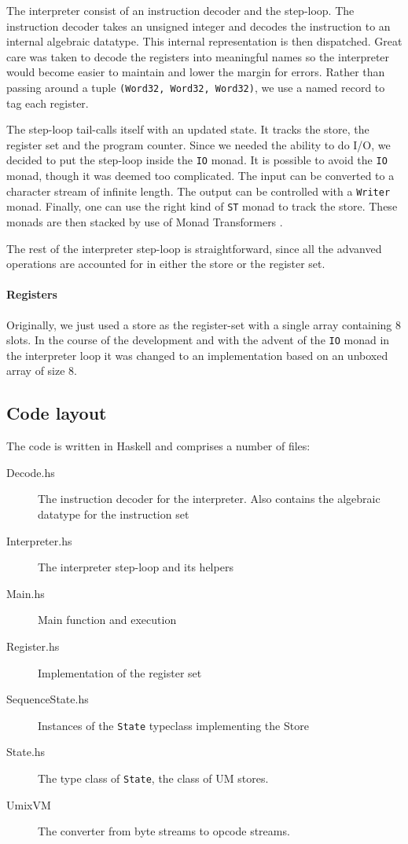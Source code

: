The interpreter consist of an instruction decoder and the
step-loop. The instruction decoder takes an unsigned integer and
decodes the instruction to an internal algebraic datatype. This
internal representation is then dispatched. Great care was taken to
decode the registers into meaningful names so the interpreter would
become easier to maintain and lower the margin for errors. Rather than
passing around a tuple \texttt{(Word32, Word32, Word32)}, we use a
named record to tag each register.

The step-loop tail-calls itself with an updated state. It tracks the
store, the register set and the program counter. Since we needed the
ability to do I/O, we decided to put the step-loop inside the
\texttt{IO} monad. It is possible to avoid the \texttt{IO}
monad, though it was deemed too complicated. The input can be
converted to a character stream of infinite length. The output can be
controlled with a \texttt{Writer} monad. Finally, one can use the
right kind of \texttt{ST} monad to track the store. These monads are
then stacked by use of Monad Transformers \cite{monad+transformer}.

The rest of the interpreter step-loop is straightforward, since all
the advanved operations are accounted for in either the store or the
register set.

\paragraph{Registers}
\label{sec:registers}

Originally, we just used a store as the register-set with a single
array containing 8 slots. In the course of the development and with
the advent of the \texttt{IO} monad in the interpreter loop it was
changed to an implementation based on an unboxed array of size 8.

\subsection{Code layout}

The code is written in Haskell and comprises a number of files:
\begin{description}
\item[Decode.hs] The instruction decoder for the interpreter. Also
  contains the algebraic datatype for the instruction set
\item[Interpreter.hs] The interpreter step-loop and its helpers
\item[Main.hs] Main function and execution
\item[Register.hs] Implementation of the register set
\item[SequenceState.hs] Instances of the \texttt{State} typeclass
  implementing the Store
\item[State.hs] The type class of \texttt{State}, the class of UM stores.
\item[UmixVM] The converter from byte streams to opcode streams.
\end{description}
